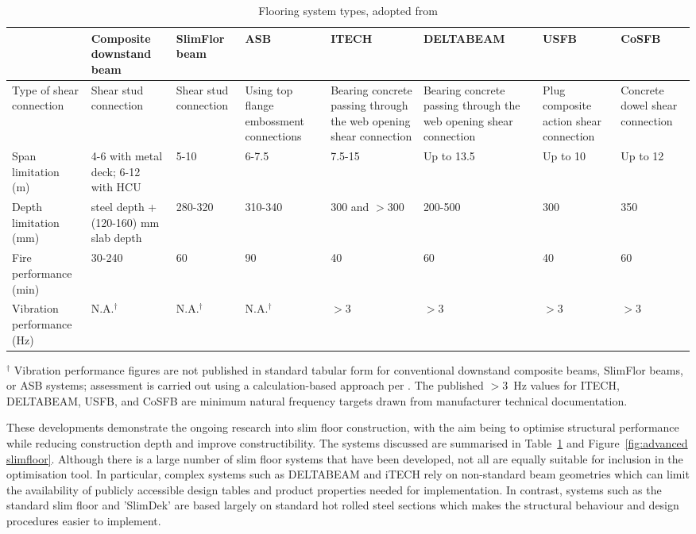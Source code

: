 \begin{table}[h]
\centering
\scriptsize
\caption{Flooring system types, adopted from \citep{RefWorks:ahmed2019evolution}}
\label{tab:slimfloor_comparison}
\begin{tabularx}{\textwidth}{p{2cm}XXXXXXX}
\toprule
 & Composite downstand beam & SlimFlor beam & ASB & ITECH & DELTABEAM & USFB & CoSFB \\
\midrule

Type of shear connection &
Shear stud connection &
Shear stud connection &
Using top flange embossment connections &
Bearing concrete passing through the web opening shear connection &
Bearing concrete passing through the web opening shear connection &
Plug composite action shear connection &
Concrete dowel shear connection \\

Span limitation (m) &
4-6 with metal deck; 6-12 with HCU &
5-10 &
6-7.5 &
7.5-15 &
Up to 13.5 &
Up to 10 &
Up to 12 \\

Depth limitation (mm) &
steel depth + (120-160) mm slab depth &
280-320 &
310-340 &
300 and $>$300 &
200-500 &
300 &
350 \\

Fire performance (min) &
30-240 &
60 &
90 &
40 &
60 &
40 &
60 \\

Vibration performance (Hz) &
N.A.$^\dagger$ &
N.A.$^\dagger$ &
N.A.$^\dagger$ &
$>3$ &
$>3$ &
$>3$ &
$>3$ \\

\bottomrule
    \end{tabularx}
    \vspace{4pt}
    {\footnotesize
    $^\dagger$ Vibration performance figures are not published in
    standard tabular form for conventional downstand composite
    beams, SlimFlor beams, or ASB systems; assessment is carried
    out using a calculation-based approach per \citet{RefWorks:hicks2009p354}.
    The published $>3$~Hz values for ITECH, DELTABEAM, USFB,
    and CoSFB are minimum natural frequency targets drawn from
    manufacturer technical documentation.
    }
\end{table}

These developments demonstrate the ongoing research into slim floor construction, with the aim being to optimise structural performance while reducing construction depth and improve constructibility. The systems discussed are summarised in Table~\ref{tab:slimfloor_comparison} and Figure~\ref{fig:advanced slimfloor}. Although there is a large number of slim floor systems that have been developed, not all are equally suitable for inclusion in the optimisation tool. In particular, complex systems such as DELTABEAM and iTECH rely on non-standard beam geometries which can limit the availability of publicly accessible design tables and product properties needed for implementation. In contrast, systems such as the standard slim floor and 'SlimDek' are based largely on standard hot rolled steel sections which makes the structural behaviour and design procedures easier to implement. 

